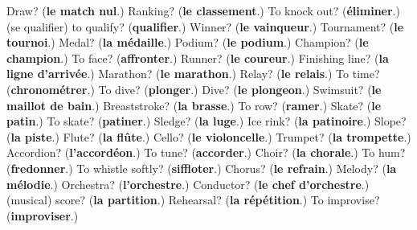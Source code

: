 \begin{tcolorbox}[breakable,colback=teal!4,colframe=teal!35!black,title={Before you move on}]
Draw? (\textbf{le match nul}.) Ranking? (\textbf{le classement}.) To knock out? (\textbf{éliminer}.) (se qualifier) to qualify? (\textbf{qualifier}.) Winner? (\textbf{le vainqueur}.) Tournament? (\textbf{le tournoi}.) Medal? (\textbf{la médaille}.) Podium? (\textbf{le podium}.) Champion? (\textbf{le champion}.) To face? (\textbf{affronter}.) Runner? (\textbf{le coureur}.) Finishing line? (\textbf{la ligne d'arrivée}.) Marathon? (\textbf{le marathon}.) Relay? (\textbf{le relais}.) To time? (\textbf{chronométrer}.) To dive? (\textbf{plonger}.) Dive? (\textbf{le plongeon}.) Swimsuit? (\textbf{le maillot de bain}.) Breaststroke? (\textbf{la brasse}.) To row? (\textbf{ramer}.) Skate? (\textbf{le patin}.) To skate? (\textbf{patiner}.) Sledge? (\textbf{la luge}.) Ice rink? (\textbf{la patinoire}.) Slope? (\textbf{la piste}.) Flute? (\textbf{la flûte}.) Cello? (\textbf{le violoncelle}.) Trumpet? (\textbf{la trompette}.) Accordion? (\textbf{l'accordéon}.) To tune? (\textbf{accorder}.) Choir? (\textbf{la chorale}.) To hum? (\textbf{fredonner}.) To whistle softly? (\textbf{siffloter}.) Chorus? (\textbf{le refrain}.) Melody? (\textbf{la mélodie}.) Orchestra? (\textbf{l'orchestre}.) Conductor? (\textbf{le chef d'orchestre}.) (musical) score? (\textbf{la partition}.) Rehearsal? (\textbf{la répétition}.) To improvise? (\textbf{improviser}.)
\end{tcolorbox}
